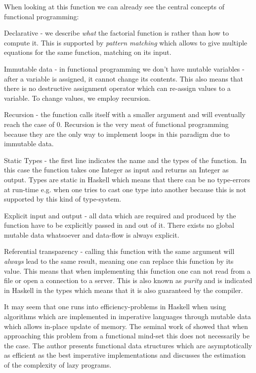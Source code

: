 When looking at this function we can already see the central concepts of functional programming: 
\begin{enumerate*}
	\item Declarative - we describe \textit{what} the factorial function is rather than how to compute it. This is supported by \textit{pattern matching} which allows to give multiple equations for the same function, matching on its input. 
	\item Immutable data - in functional programming we don't have mutable variables - after a variable is assigned, it cannot change its contents. This also means that there is no destructive assignment operator which can re-assign values to a variable. To change values, we employ recursion.
	\item Recursion - the function calls itself with a smaller argument and will eventually reach the case of 0. Recursion is the very meat of functional programming because they are the only way to implement loops in this paradigm due to immutable data.
	\item Static Types - the first line indicates the name and the types of the function. In this case the function takes one Integer as input and returns an Integer as output. Types are static in Haskell which means that there can be no type-errors at run-time e.g. when one tries to cast one type into another because this is not supported by this kind of type-system.
	\item Explicit input and output - all data which are required and produced by the function have to be explicitly passed in and out of it. There exists no global mutable data whatsoever and data-flow is always explicit.
	\item Referential transparency - calling this function with the same argument will \textit{always} lead to the same result, meaning one can replace this function by its value. This means that when implementing this function one can not read from a file or open a connection to a server. This is also known as \textit{purity} and is indicated in Haskell in the types which means that it is also guaranteed by the compiler.
\end{enumerate*}

It may seem that one runs into efficiency-problems in Haskell when using algorithms which are implemented in imperative languages through mutable data which allows in-place update of memory. The seminal work of \citep{okasaki_purely_1999} showed that when approaching this problem from a functional mind-set this does not necessarily be the case. The author presents functional data structures which are asymptotically as efficient as the best imperative implementations and discusses the estimation of the complexity of lazy programs.

